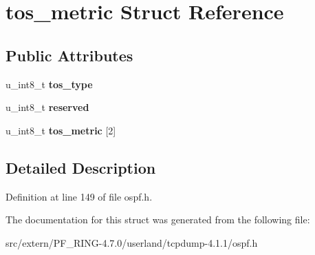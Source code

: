 \hypertarget{structtos__metric}{
\section{tos\_\-metric Struct Reference}
\label{structtos__metric}
}
\subsection*{Public Attributes}
\begin{DoxyCompactItemize}
\item 
\hypertarget{structtos__metric_a65a6f71dcd1056877d284075a8c563cd}{
u\_\-int8\_\-t {\bfseries tos\_\-type}}
\label{structtos__metric_a65a6f71dcd1056877d284075a8c563cd}

\item 
\hypertarget{structtos__metric_a35ce8b39020089a3d0751cb53198af6b}{
u\_\-int8\_\-t {\bfseries reserved}}
\label{structtos__metric_a35ce8b39020089a3d0751cb53198af6b}

\item 
\hypertarget{structtos__metric_a29497f6bdf619683f99297f5684da186}{
u\_\-int8\_\-t {\bfseries tos\_\-metric} \mbox{[}2\mbox{]}}
\label{structtos__metric_a29497f6bdf619683f99297f5684da186}

\end{DoxyCompactItemize}


\subsection{Detailed Description}


Definition at line 149 of file ospf.h.



The documentation for this struct was generated from the following file:\begin{DoxyCompactItemize}
\item 
src/extern/PF\_\-RING-\/4.7.0/userland/tcpdump-\/4.1.1/ospf.h\end{DoxyCompactItemize}
